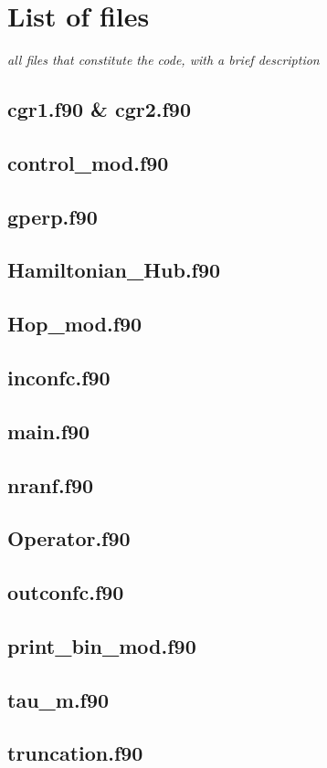 \section{List of files}
\textit{all files that constitute the code, with a brief description}
\subsection{cgr1.f90 \& cgr2.f90}
\subsection{control\_mod.f90}
\subsection{gperp.f90}
\subsection{Hamiltonian\_Hub.f90}
\subsection{Hop\_mod.f90}
\subsection{inconfc.f90}
\subsection{main.f90}
\subsection{nranf.f90}
\subsection{Operator.f90}
\subsection{outconfc.f90}
\subsection{print\_bin\_mod.f90}
\subsection{tau\_m.f90}
\subsection{truncation.f90}
